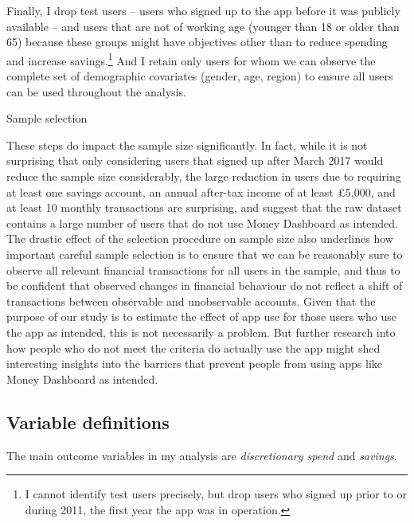 Finally, I drop test users -- users who signed up to the app before it was
publicly available -- and users that are not of working age (younger than
18 or older than 65) because these groups might have objectives other than to
reduce spending and increase savings.\footnote{I cannot identify test users
    precisely, but drop users who signed up prior to or during 2011, the first
year the app was in operation.} And I retain only users for whom we can observe
the complete set of demographic covariates (gender, age, region) to ensure all
users can be used throughout the analysis. 

\begin{table}
\centering\footnotesize
\caption{Sample selection}\label{tab:selection}

\end{table}

These steps do impact the sample size significantly. In fact, while it is not
surprising that only considering users that signed up after March 2017 would
reduce the sample size considerably, the large reduction in users due to
requiring at least one savings account, an annual after-tax income of at least
\pounds5,000, and at least 10 monthly transactions are surprising, and suggest
that the raw dataset contains a large number of users that do not use Money
Dashboard as intended. The drastic effect of the selection procedure on sample
size also underlines how important careful sample selection is to ensure that
we can be reasonably sure to observe all relevant financial transactions for
all users in the sample, and thus to be confident that observed changes in
financial behaviour do not reflect a shift of transactions between observable
and unobservable accounts. Given that the purpose of our study is to estimate the effect of app use for those users who use the app as intended, this is not necessarily a problem. But further research into how people who do not meet the criteria do actually use the app might shed interesting insights into the barriers that prevent people from using apps like Money Dashboard as intended.

\subsection{Variable definitions}%

The main outcome variables in my analysis are \textit{discretionary spend} and
\textit{savings}.

